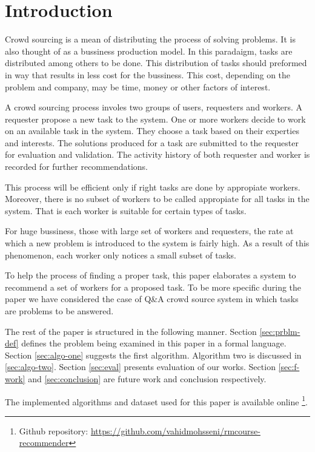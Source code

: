 \documentclass{template}
\begin{document}
\section{Introduction}
\label{sec:intro}
Crowd sourcing is a mean of distributing the process of solving problems.
It is also thought of as a bussiness production model. In this paradaigm,
tasks are distributed among others to be done. This distribution of tasks
should preformed in way that results in less cost for the bussiness. This
cost, depending on the problem and company, may be time, money or other factors
of interest.

A crowd sourcing process involes two groups of users, requesters and workers. 
A requester propose a new task to the system. One or more workers decide to work
on an available task in the system. They choose a task based on their experties and interests. 
The solutions produced for a task are submitted to the requester for evaluation and validation.
The activity history of both requester and worker is recorded for further recommendations.

This process will be efficient only if right tasks are done by appropiate workers.
Moreover, there is no subset of workers to be called appropiate for all tasks
in the system. That is each worker is suitable for certain types of tasks.

For huge bussiness, those with large set of workers and requesters, the rate at
which a new problem is introduced to the system is fairly high. As a result of this
phenomenon, each worker only notices a small subset of tasks.

To help the process of finding a proper task, this paper elaborates a system
to recommend a set of workers for a proposed task. To be more specific during the
paper we have considered the case of Q\&A crowd source system in which tasks are
problems to be answered.

The rest of the paper is structured in the following manner.
Section \ref{sec:prblm-def} defines the problem being examined in this 
paper in a formal language. Section \ref{sec:algo-one} suggests the first algorithm.
Algorithm two is discussed in \ref{sec:algo-two}. 
Section \ref{sec:eval} presents evaluation of our works. 
Section \ref{sec:f-work} and \ref{sec:conclusion} are future work and conclusion respectively.

The implemented algorithms and dataset used for this paper is available online
\footnote{Github repository: \url{https://github.com/vahidmohsseni/rmcourse-recommender}}.
\end{document}
